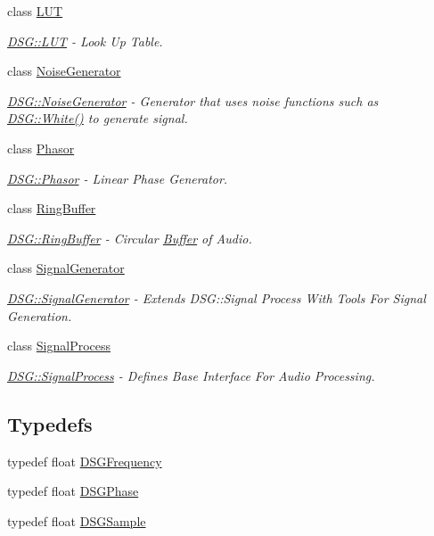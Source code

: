 \begin{DoxyCompactItemize}
class \hyperlink{class_d_s_g_1_1_l_u_t}{L\+U\+T}
\begin{DoxyCompactList}\small\item\em \hyperlink{class_d_s_g_1_1_l_u_t}{D\+S\+G\+::\+L\+U\+T} -\/ Look Up Table. \end{DoxyCompactList}\item 
class \hyperlink{class_d_s_g_1_1_noise_generator}{Noise\+Generator}
\begin{DoxyCompactList}\small\item\em \hyperlink{class_d_s_g_1_1_noise_generator}{D\+S\+G\+::\+Noise\+Generator} -\/ Generator that uses noise functions such as \hyperlink{namespace_d_s_g_1_1_noise_a0d1c4b4522d2e56b1aa604e45ab92066}{D\+S\+G\+::\+White()} to generate signal. \end{DoxyCompactList}\item 
class \hyperlink{class_d_s_g_1_1_phasor}{Phasor}
\begin{DoxyCompactList}\small\item\em \hyperlink{class_d_s_g_1_1_phasor}{D\+S\+G\+::\+Phasor} -\/ Linear Phase Generator. \end{DoxyCompactList}\item 
class \hyperlink{class_d_s_g_1_1_ring_buffer}{Ring\+Buffer}
\begin{DoxyCompactList}\small\item\em \hyperlink{class_d_s_g_1_1_ring_buffer}{D\+S\+G\+::\+Ring\+Buffer} -\/ Circular \hyperlink{class_d_s_g_1_1_buffer}{Buffer} of Audio. \end{DoxyCompactList}\item 
class \hyperlink{class_d_s_g_1_1_signal_generator}{Signal\+Generator}
\begin{DoxyCompactList}\small\item\em \hyperlink{class_d_s_g_1_1_signal_generator}{D\+S\+G\+::\+Signal\+Generator} -\/ Extends D\+S\+G\+::\+Signal Process With Tools For Signal Generation. \end{DoxyCompactList}\item 
class \hyperlink{class_d_s_g_1_1_signal_process}{Signal\+Process}
\begin{DoxyCompactList}\small\item\em \hyperlink{class_d_s_g_1_1_signal_process}{D\+S\+G\+::\+Signal\+Process} -\/ Defines Base Interface For Audio Processing. \end{DoxyCompactList}\end{DoxyCompactItemize}
\subsection*{Typedefs}
\begin{DoxyCompactItemize}
\item 
typedef float \hyperlink{namespace_d_s_g_a4315a061386fa1014fda09b15d3a6973}{D\+S\+G\+Frequency}
\item 
typedef float \hyperlink{namespace_d_s_g_a44431ce1eb0a7300efdd207bc879e52c}{D\+S\+G\+Phase}
\item 
typedef float \hyperlink{namespace_d_s_g_ac39a94cd27ebcd9c1e7502d0c624894a}{D\+S\+G\+Sample}
\end{DoxyCompactItemize}
